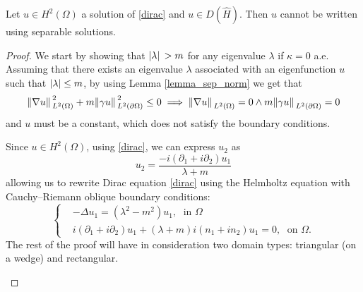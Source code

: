 \begin{proposition}\label{dirac_not_polar}
    Let \(u \in H^2(\Omega)\) a solution of \eqref{dirac} and \(u \in D(\hat{H})\). Then \(u\) cannot be written using separable solutions.
\end{proposition}
\begin{proof}
    We start by showing that \(\abs*{\lambda}>m\) for any eigenvalue \(\lambda\) if \(\kappa = 0\) a.e. Assuming that there exists an eigenvalue \(\lambda\) associated with an eigenfunction \(u\) such that \(\abs{\lambda} \leq m\), by using Lemma \ref*{lemma_sep_norm} we get that 
    \[
    \norm*{\nabla u }_{L^2(\Omega)}^2 + m \norm*{\gamma u}_{L^2(\partial\Omega)}^2 \leq 0 \implies \norm*{\nabla u }_{L^2(\Omega)} = 0 \land m \norm*{\gamma u}_{L^2(\partial\Omega)} = 0
    \]
    and \(u\) must be a constant, which does not satisfy the boundary conditions.

    Since \(u \in H^2(\Omega)\), using \eqref{dirac}, we can express \(u_2\) as
    \[
    u_2 = \frac{-i (\partial_1 + i\partial_2)u_1}{\lambda + m}    
    \]
    allowing us to rewrite Dirac equation \eqref{dirac} using the Helmholtz equation with Cauchy–Riemann oblique boundary conditions:
    \begin{equation}\label{helm_system}
        \begin{cases}
            &-\Delta u_1 = (\lambda^2 - m^2)u_1, \; \text{ in } \Omega\\
            & i (\partial_1 + i\partial_2)u_1 + (\lambda + m)i(n_1 + i n_2)u_1 = 0, \; \text{ on } \Omega.
        \end{cases}      
    \end{equation}
    The rest of the proof will have in consideration two domain types: triangular (on a wedge) and rectangular.
    \begin{enumerate}
        

\end{enumerate}
\end{proof}
